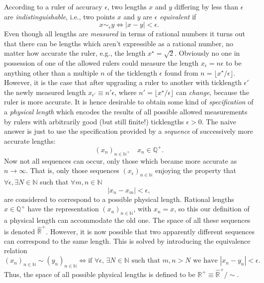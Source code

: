 \documentclass[11pt]{amsart}
\theoremstyle{plain}%
\theoremstyle{definition}
\theoremstyle{remark}
\begin{document}
According to a ruler of accuracy $\epsilon$, two lengths $x$ and $y$ differing by less than $\epsilon$ are \emph{indistinguishable}, i.e., two points $x$ and $y$ are \emph{$\epsilon$ equivalent} if
\begin{equation}
	x\sim_\epsilon y \Leftrightarrow |x-y| < \epsilon. 
\end{equation} 
Even though all lengths are \emph{measured} in terms of rational numbers it turns out that there can be lengths which aren't expressible as a rational number, no matter how accurate the ruler, e.g., the length $x^\star = \sqrt{2}$. Obviously no one in possession of one of the allowed rulers could measure the length $x_{\epsilon} = n\epsilon$ to be anything other than a multiple $n$ of the ticklength $\epsilon$ found from $n = \lfloor x^\star/\epsilon \rfloor$. However, it is the case that after upgrading a ruler to another with ticklength $\epsilon'$ the newly measured length $x_{\epsilon'} \equiv n'\epsilon$, where $n' = \lfloor x^\star/\epsilon \rfloor$ can \emph{change}, because the ruler is more accurate. It is hence desirable to obtain some kind of \emph{specification} of a \emph{physical length} which encodes the results of all possible allowed measurements by rulers with arbitrarily good (but still finite!) ticklengths $\epsilon > 0$. The naive answer is just to use the specification provided by a \emph{sequence} of successively more accurate lengths:
\begin{equation}
	(x_n)_{n \in \mathbb{N}}, \quad x_n\in \mathbb{Q}^+.
\end{equation}
Now not all sequences can occur, only those which became more accurate as $n \rightarrow \infty$. That is, only those sequences $(x_\epsilon)_{n \in \mathbb{N}}$ enjoying the property that $\forall \epsilon, \exists N\in \mathbb{N}$ such that $\forall m,n\in \mathbb{N}$
\begin{equation}
	|x_n-x_m| < \epsilon,
\end{equation} 
are considered to correspond to a possible physical length. Rational lengths $x\in \mathbb{Q}^+$ have the representation $(x_n)_{n\in \mathbb{N}}$, with $x_n = x$, so this our definition of a physical length can accommodate the old one. The space of all these sequences is denoted $\widehat{\mathbb{R}}^+$. However, it is now possible that two apparently different sequences can correspond to the same length. This is solved by introducing the equivalence relation 
\begin{equation}
	(x_n)_{n \in \mathbb{N}} \sim (y_n)_{n \in \mathbb{N}} \Leftrightarrow \text{if $\forall \epsilon$, $\exists N\in \mathbb{N}$ such that $m,n>N$ we have $|x_n-y_n| < \epsilon$.} 
\end{equation}
Thus, the space of all possible physical lengths is defined to be $\mathbb{R}^+ \equiv \widehat{\mathbb{R}}^+/\sim$.
\end{document}
